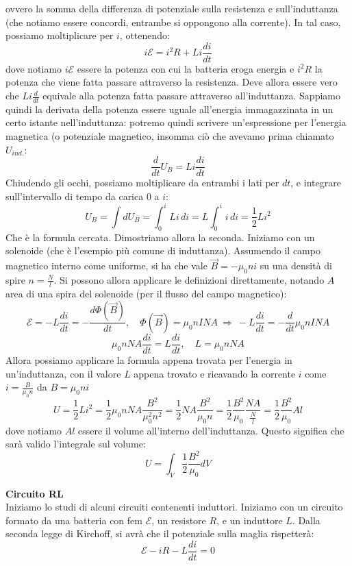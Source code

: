 \documentclass[a4paper,12pt]{article}
\begin{document}
ovvero la somma della differenza di potenziale sulla resistenza e sull'induttanza (che notiamo essere concordi, entrambe si oppongono alla corrente). In tal caso, possiamo moltiplicare per $i$, ottenendo:
$$ i\mathcal{E} = i^2R +Li \frac{di}{dt} $$
dove notiamo $i\mathcal{E}$ essere la potenza con cui la batteria eroga energia e  $i^2R$ la potenza che viene fatta passare attraverso la resistenza. Deve allora essere vero che $Li \frac{d}{dt}$ equivale alla potenza fatta
passare attraverso all'induttanza. Sappiamo quindi la derivata della potenza essere uguale all'energia immagazzinata in un certo istante nell'induttanza: potremo quindi scrivere un'espressione per l'energia magnetica (o potenziale
magnetico, insomma ciò che avevamo prima chiamato $U_{ind.}$:
$$ \frac{d}{dt}U_B = Li \frac{di}{dt} $$
Chiudendo gli occhi, possiamo moltiplicare da entrambi i lati per $dt$, e integrare sull'intervallo di tempo da carica $0$ a $i$:
$$ U_B = \int dU_B = \int_0^i Li \, di = L \int_0^i i \, di = \frac{1}{2}Li^2 $$
Che è la formula cercata. Dimostriamo allora la seconda. Iniziamo con un solenoide (che è l'esempio più comune di induttanza). Assumendo il campo magnetico interno come uniforme, si ha che vale $\vec{B} = -\mu_0 n i$
su una densità di spire $n = \frac{N}{l}$. Si possono allora applicare le definizioni direttamente, notando $A$ area di una spira del solenoide (per il flusso del campo magnetico):
$$ \mathcal{E} = -L \frac{di}{dt} = -\frac{d\Phi(\vec{B})}{dt}, \quad \Phi(\vec{B}) = \mu_0 n I N A \ \Rightarrow \ -L \frac{di}{dt} = -\frac{d}{dt} \mu_0 n I N A $$
$$ \mu_0 n N A \frac{di}{dt} = L \frac{di}{dt}, \quad L = \mu_0 n N A $$
Allora possiamo applicare la formula appena trovata per l'energia in un'induttanza, con il valore $L$ appena trovato e ricavando la corrente $i$ come $i = \frac{B}{\mu_0 n}$ da $B = \mu_0 n i$
$$ U = \frac{1}{2}Li^2 = \frac{1}{2} \mu_0 n N A \frac{B^2}{\mu_0^2 n^2} = \frac{1}{2}NA \frac{B^2}{\mu_0 n} = \frac{1}{2} \frac{B^2}{\mu_0} \frac{NA}{\frac{N}{l}} = \frac{1}{2} \frac{B^2}{\mu_0} Al$$
dove notiamo $Al$ essere il volume all'interno dell'induttanza. Questo significa che sarà valido l'integrale sul volume:
$$ U = \int_V \frac{1}{2}\frac{B^2}{\mu_0}dV $$
\par\smallskip
\textbf{Circuito RL} \\
Iniziamo lo studi di alcuni circuiti contenenti induttori. Iniziamo con un circuito formato da una batteria con fem $\mathcal{E}$, un resistore $R$, e un induttore $L$. Dalla seconda legge di Kirchoff, si avrà che il potenziale
sulla maglia rispetterà:
$$ \mathcal{E} -iR -L \frac{di}{dt} = 0 $$
\end{document}
